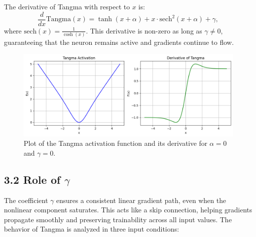 \documentclass{article}
\begin{document}
The derivative of Tangma with respect to \( x \) is:
\[
\frac{d}{dx} \text{Tangma}(x) = \tanh(x + \alpha) + x \cdot \text{sech}^2(x + \alpha) + \gamma,
\]
where \( \text{sech}(x) = \frac{1}{\cosh(x)} \). This derivative is non-zero as long as \( \gamma \neq 0 \), guaranteeing that the neuron remains active and gradients continue to flow.




\begin{figure}[H]
    \centering
    \includegraphics[width=0.9\linewidth]{function_derivative.png}
    \caption{Plot of the Tangma activation function and its derivative for $\alpha = 0$ and $\gamma = 0$.}
    \label{fig:function-derivative-graph}
\end{figure}


\subsection*{3.2 Role of \(\gamma\)}
The coefficient \( \gamma \) ensures a consistent linear gradient path, even when the nonlinear component saturates. This acts like a skip connection, helping gradients propagate smoothly and preserving trainability across all input values. The behavior of Tangma is analyzed in three input conditions:
\end{document}
